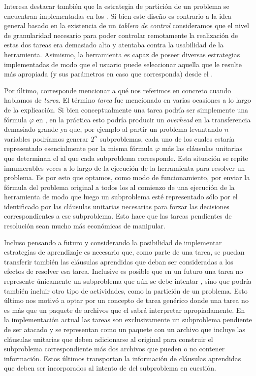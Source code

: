 Interesa destacar también que la estrategia de partición de un problema
se encuentran implementadas en los \ws. Si
bien este diseño es contrario a la idea general basado en la existencia de un \emph{tablero de control}
consideramos que el nivel de granularidad necesario para poder controlar
remotamente la realización de estas dos tareas era demasiado alto y atentaba
contra la usabilidad de la herramienta. Asimismo, la herramienta es capaz de
poseer diversas estrategias implementadas
de modo que el usuario puede seleccionar aquella que le resulte más apropiada (y sus
parámetros en caso que corresponda) desde el \fend.

Por último, corresponde mencionar a qué nos referimos en concreto cuando
hablamos de \emph{tarea}. El término \emph{tarea} fue mencionado en varias
ocasiones a lo largo de la explicación. Si bien conceptualmente una tarea
podría ser simplemente una fórmula $\varphi$ en \cnf, en la práctica esto
podría producir un \emph{overhead} en la transferencia demasiado grande ya
que, por ejemplo al partir un problema levantando $n$ variables podríamos
generar $2^n$ subproblemas, cada uno de los cuales estaría representado
esencialmente por la misma fórmula $\varphi$ más las cláusulas unitarias
que determinan el \gp al que cada subproblema corresponde. Esta situación se repite innumerables veces a lo
largo de la ejecución de la herramienta para resolver un problema. Es por esto
que optamos, como modo de funcionamiento, por enviar la fórmula \cnf del problema original a
todos los \ws al comienzo de una ejecución de la herramienta de modo que luego
un subproblema esté representado sólo por el \gp identificado por las cláusulas unitarias necesarias para
forzar las decisiones correspondientes a ese subproblema. Esto hace que las
tareas pendientes de resolución sean mucho más económicas de manipular. 

Incluso pensando a futuro y considerando la posibilidad de implementar estrategias de
aprendizaje es necesario que, como parte de una tarea, se puedan transferir
también las cláusulas aprendidas que deban ser consideradas a los efectos de resolver esa tarea. Inclusive es
posible que en un futuro una tarea no represente únicamente un subproblema que
aún se debe intentar \solvear, sino que podría también incluir otro tipo de
actividades, como la partición de un problema. Esto último nos motivó a optar
por un concepto de tarea genérico donde una tarea no es más que un paquete de
archivos que el \w sabrá interpretar apropiadamente. En la implementación
actual las tareas son exclusivamente un subproblema pendiente de ser atacado y
se representan como un paquete con un archivo que incluye las cláusulas
unitarias que deben adicionarse al \cnf original para construir el subproblema
correspondiente más dos archivos que pueden o no contener información. Estos
últimos transportan la información de cláusulas aprendidas que deben ser
incorporados al intento de \solving del subproblema en cuestión.

